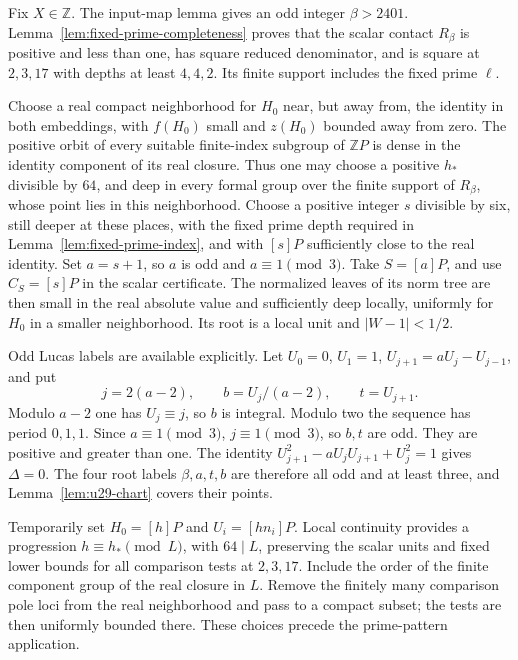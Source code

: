 \documentclass[11pt,a4paper]{article}
\theoremstyle{definition}
\theoremstyle{remark}
\begin{document}
Fix $X\in\mathbb Z$. The input-map lemma gives an odd integer
$\beta>2401$. Lemma~\ref{lem:fixed-prime-completeness} proves that
the scalar contact $R_\beta$ is positive and less than one, has square
reduced denominator, and is square at $2,3,17$ with depths at least
$4,4,2$. Its finite support includes the fixed prime $\ell$.

Choose a real compact neighborhood for $H_0$ near, but away from, the
identity in both embeddings, with $f(H_0)$ small and $z(H_0)$ bounded
away from zero.  The positive orbit of every suitable finite-index
subgroup of $\mathbb ZP$ is dense in the identity component of its
real closure.  Thus one may choose a positive $h_*$ divisible by
$64$, and deep in every formal group over the finite support of
$R_\beta$, whose point lies in this neighborhood.  Choose a positive
integer $s$ divisible by six, still deeper at these places, with the fixed prime depth required in Lemma~\ref{lem:fixed-prime-index}, and with $[s]P$ sufficiently close to the real identity.
Set $a=s+1$, so $a$ is odd and $a\equiv1\pmod3$.
Take $S=[a]P$, and use $C_S=[s]P$ in the scalar certificate.
The normalized leaves of its norm tree are then small in the real
absolute value and sufficiently deep locally, uniformly for $H_0$ in
a smaller neighborhood.  Its root is a local unit and
$|W-1|<1/2$.

Odd Lucas labels are available explicitly.  Let
$U_0=0$, $U_1=1$, $U_{j+1}=aU_j-U_{j-1}$, and put
\[
              j=2(a-2),\qquad b=U_j/(a-2),\qquad t=U_{j+1}.
\]
Modulo $a-2$ one has $U_j\equiv j$, so $b$ is integral.
Modulo two the sequence has period $0,1,1$.  Since $a\equiv1\pmod3$,
$j\equiv1\pmod3$, so $b,t$ are odd.  They are positive and greater
than one.  The identity
$U_{j+1}^2-aU_jU_{j+1}+U_j^2=1$ gives $\Delta=0$.
The four root labels $\beta,a,t,b$ are therefore all odd and at least
three, and Lemma~\ref{lem:u29-chart} covers their points.

Temporarily set $H_0=[h]P$ and $U_i=[hn_i]P$.  Local continuity
provides a progression $h\equiv h_*\pmod L$, with $64\mid L$,
preserving the scalar units and fixed lower bounds for all comparison
tests at $2,3,17$.  Include the order of the finite component group
of the real closure in $L$.  Remove the finitely many comparison
pole loci from the real neighborhood and pass to a compact subset;
the tests are then uniformly bounded there.  These choices precede
the prime-pattern application.
\end{document}
